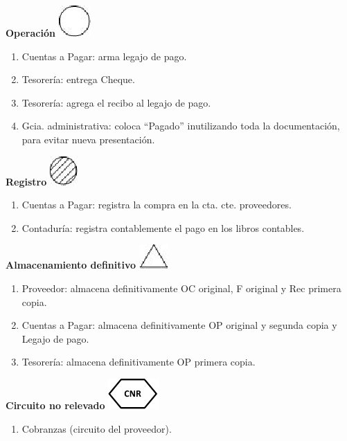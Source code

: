 \begin{center}
  \textbf{Operación}
  \includegraphics{./Images/Simbolos/simbolo-Operacion.png}
\end{center}
\begin{enumerate}
  \item Cuentas a Pagar: arma legajo de pago.
  \item Tesorería: entrega Cheque.
  \item Tesorería: agrega el recibo al legajo de pago.
  \item Gcia. administrativa: coloca “Pagado” inutilizando toda la documentación, para evitar nueva presentación.
\end{enumerate}

\begin{center}
  \textbf{Registro}
  \includegraphics{./Images/Simbolos/simbolo-Registro.png}
\end{center}
\begin{enumerate}
  \item Cuentas a Pagar: registra la compra en la cta. cte. proveedores.
  \item Contadur\'ia: registra contablemente el pago en los libros contables. 
\end{enumerate}

\begin{center}
  \textbf{Almacenamiento definitivo}
  \includegraphics{./Images/Simbolos/simbolo-Almacenamiento-Definitivo.png}
\end{center}
\begin{enumerate}
  \item Proveedor: almacena definitivamente OC original, F original y Rec primera copia.
  \item Cuentas a Pagar: almacena definitivamente OP original y segunda copia y Legajo de pago.
  \item Tesorería: almacena definitivamente OP primera copia.
\end{enumerate}


\begin{center}
  \textbf{Circuito no relevado}
  \includegraphics{./Images/Simbolos/simbolo-CNR.png}
\end{center}
\begin{enumerate}
  \item Cobranzas (circuito del proveedor).
\end{enumerate}

